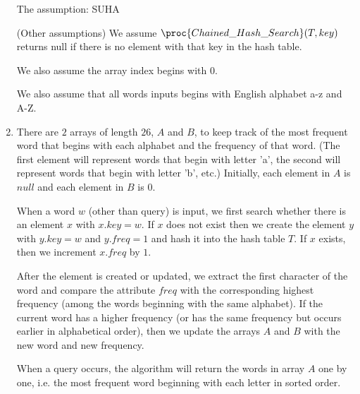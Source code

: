 \documentclass[11pt, answers]{exam}
\theoremstyle{plain}
\theoremstyle{definition}
\begin{document}
\begin{questions}
\begin{solution}
\begin{enumerate}
The assumption: SUHA

(Other assumptions)
We assume $\proc{Chained\_Hash\_Search}(T, key)$ returns null if there is no element with that key in the hash table.

We also assume the array index begins with 0.

We also assume that all words inputs begins with English alphabet a-z and A-Z.

\item There are $2$ arrays of length $26$, $A$ and $B$, to keep track of the most frequent word that begins with each alphabet and the frequency of that word. (The first element will represent words that begin with letter 'a', the second will represent words that begin with letter 'b', etc.) Initially, each element in $A$ is $null$ and each element in $B$ is $0$. 

When a word $w$ (other than query) is input, we first search whether there is an element $x$ with $x.key=w$. If $x$ does not exist then we create the element $y$ with $y.key=w$ and $y.freq=1$ and hash it into the hash table $T$. If $x$ exists, then we increment $x.freq$ by $1$.

After the element is created or updated, we extract the first character of the word and compare the attribute $freq$ with the corresponding highest frequency (among the words beginning with the same alphabet). If the current word has a higher frequency (or has the same frequency but occurs earlier in alphabetical order), then we update the arrays $A$ and $B$ with the new word and new frequency. 

When a query occurs, the algorithm will return the words in array $A$ one by one, i.e. the most frequent word beginning with each letter in sorted order.


\end{enumerate}
\end{solution}
\end{questions}
\end{document}
